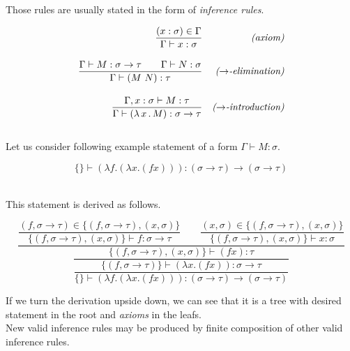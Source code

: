 \documentclass[12pt,a4paper]{report}
\newcommand{\Lets}{Let us\xspace}
\newcommand{\tur}[3]{#1\vdash{}#2:#3}
\newcommand{\turst}[3]{$#1\vdash{}#2:#3$\xspace}
\newcommand{\GMS}{\turst{\Gamma}{M}{\sigma}}
\begin{document}
Those rules are usually stated in the form of \textit{inference rules}.

\newcommand{\ruleI}[2]{\dfrac{#1}{#2}}
\newcommand{\ruleII}[3]{\dfrac{#1 \qquad #2}{#3}}
\newcommand{\ruleIIs}[3]{\dfrac{#1 ~ #2}{#3}}
\newcommand{\ruleIII}[4]{\dfrac{#1 \qquad #2 \qquad #3}{#4}}
\newcommand{\ruleIV}[5]{\dfrac{#1 \qquad #2 \qquad #3 \qquad #4}{#5}}


\begin{align*}
\ruleI { (x:\sigma) \in \Gamma }
       { \tur{\Gamma}{x}{\sigma} }
&& \textit{(axiom)} \\[1em]
\ruleII{ \tur{\Gamma}{M}{\sigma \ar \tau} }
       { \tur{\Gamma}{N}{\sigma} }
       { \tur{\Gamma}{(M~N)}{\tau} }
&& \textit{($\ar$-elimination)} \\[1em]
\ruleI { \tur{\Gamma,x:\sigma}{M}{\tau} }
       { \tur{\Gamma}{\lamb{x}{M}}{\sigma \ar \tau} }
&& \textit{($\ar$-introduction)} \\[1em]
\end{align*}

\Lets consider following example statement of a form \GMS.

$$
	\{\} \vdash (\lambda f . (\lambda x . (f x) )) : 
	(\sigma \rightarrow \tau) \rightarrow ( \sigma \rightarrow \tau ) 
$$~
	
This statement is derived as follows. 

\begin{equation*}
\dfrac{
	\dfrac{ (f,\sigma \rightarrow \tau) \in \{ (f,\sigma \rightarrow \tau) , (x,\sigma)  \}  }
	     { \{ (f,\sigma \rightarrow \tau) , (x,\sigma)  \} \vdash f : \sigma \rightarrow \tau }
	\qquad
	\dfrac{ (x,\sigma) \in \{ (f,\sigma \rightarrow \tau) , (x,\sigma)  \}  }
	     { \{ (f,\sigma \rightarrow \tau) , (x,\sigma)  \} \vdash x : \sigma }
	 }
	 {
		\dfrac{		 	
	 		\{ (f,\sigma \rightarrow \tau) , (x,\sigma)  \} \vdash (f x) : \tau
	 	}{
			\dfrac{\{ (f,\sigma \rightarrow \tau) \} \vdash (\lambda x . (f x) ) : 
			\sigma \rightarrow \tau}
			{ \{ \} \vdash (\lambda f . (\lambda x . (f x) ) ) 
			  : (\sigma \rightarrow \tau) \rightarrow (\sigma \rightarrow \tau) }
	 	}
	 }
\end{equation*}		

If we turn the derivation upside down, we can see that it is a tree with 
desired statement in the root and \textit{axioms} in the leafs. \\


New valid inference rules may be produced by finite composition of 
other valid inference rules. 
\end{document}
